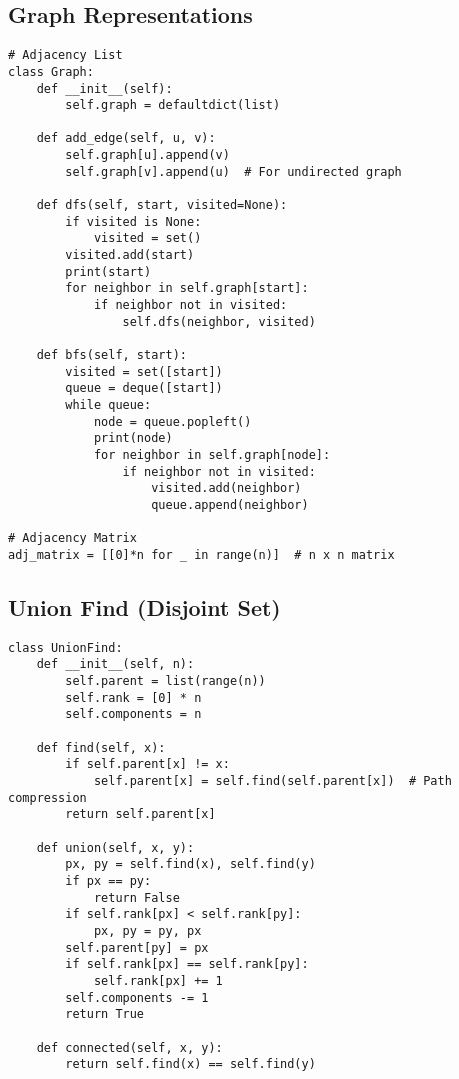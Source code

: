 \subsection{Graph Representations}
\begin{verbatim}
# Adjacency List
class Graph:
    def __init__(self):
        self.graph = defaultdict(list)
    
    def add_edge(self, u, v):
        self.graph[u].append(v)
        self.graph[v].append(u)  # For undirected graph
    
    def dfs(self, start, visited=None):
        if visited is None:
            visited = set()
        visited.add(start)
        print(start)
        for neighbor in self.graph[start]:
            if neighbor not in visited:
                self.dfs(neighbor, visited)
    
    def bfs(self, start):
        visited = set([start])
        queue = deque([start])
        while queue:
            node = queue.popleft()
            print(node)
            for neighbor in self.graph[node]:
                if neighbor not in visited:
                    visited.add(neighbor)
                    queue.append(neighbor)

# Adjacency Matrix
adj_matrix = [[0]*n for _ in range(n)]  # n x n matrix
\end{verbatim}

\subsection{Union Find (Disjoint Set)}
\begin{verbatim}
class UnionFind:
    def __init__(self, n):
        self.parent = list(range(n))
        self.rank = [0] * n
        self.components = n
    
    def find(self, x):
        if self.parent[x] != x:
            self.parent[x] = self.find(self.parent[x])  # Path compression
        return self.parent[x]
    
    def union(self, x, y):
        px, py = self.find(x), self.find(y)
        if px == py:
            return False
        if self.rank[px] < self.rank[py]:
            px, py = py, px
        self.parent[py] = px
        if self.rank[px] == self.rank[py]:
            self.rank[px] += 1
        self.components -= 1
        return True
    
    def connected(self, x, y):
        return self.find(x) == self.find(y)
\end{verbatim}

